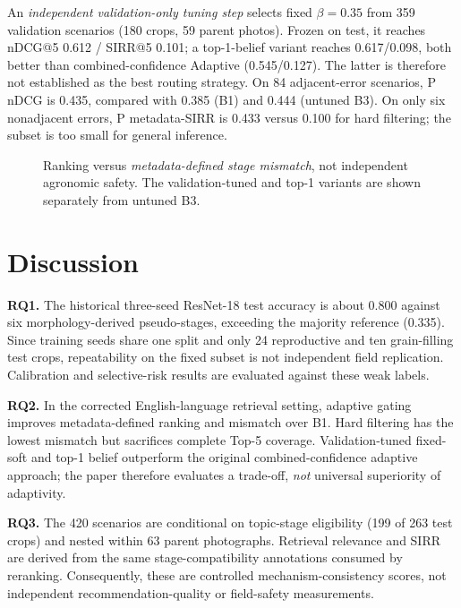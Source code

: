 \documentclass[conference,a4paper]{IEEEtran}
\begin{document}
An \emph{independent validation-only tuning step} selects fixed $\beta=0.35$ from 359 validation scenarios (180 crops, 59 parent photos). Frozen on test, it reaches nDCG@5 0.612 / SIRR@5 0.101; a top-1-belief variant reaches 0.617/0.098, both better than combined-confidence Adaptive (0.545/0.127). The latter is therefore not established as the best routing strategy. On 84 adjacent-error scenarios, P nDCG is 0.435, compared with 0.385 (B1) and 0.444 (untuned B3). On only six nonadjacent errors, P metadata-SIRR is 0.433 versus 0.100 for hard filtering; the subset is too small for general inference.

\begin{figure}[t]
\centering
\resizebox{0.78\linewidth}{!}{}
\caption{Ranking versus \emph{metadata-defined stage mismatch}, not independent agronomic safety. The validation-tuned and top-1 variants are shown separately from untuned B3.}
\label{fig:tradeoff}
\end{figure}

\section{Discussion}

\textbf{RQ1.} The historical three-seed ResNet-18 test accuracy is about 0.800 against six morphology-derived pseudo-stages, exceeding the majority reference (0.335). Since training seeds share one split and only 24 reproductive and ten grain-filling test crops, repeatability on the fixed subset is not independent field replication. Calibration and selective-risk results are evaluated against these weak labels.

\textbf{RQ2.} In the corrected English-language retrieval setting, adaptive gating improves metadata-defined ranking and mismatch over B1. Hard filtering has the lowest mismatch but sacrifices complete Top-5 coverage. Validation-tuned fixed-soft and top-1 belief outperform the original combined-confidence adaptive approach; the paper therefore evaluates a trade-off, \emph{not} universal superiority of adaptivity.

\textbf{RQ3.} The 420 scenarios are conditional on topic-stage eligibility (199 of 263 test crops) and nested within 63 parent photographs. Retrieval relevance and SIRR are derived from the same stage-compatibility annotations consumed by reranking. Consequently, these are controlled mechanism-consistency scores, not independent recommendation-quality or field-safety measurements.
\end{document}
